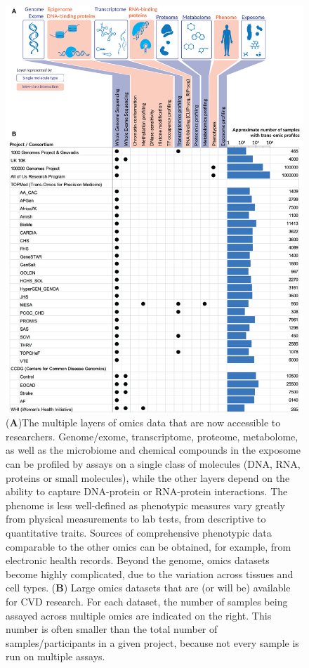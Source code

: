 \documentclass[letter]{bioinfo}
\begin{document}
    	\begin{figure}[!tpb]
	\includegraphics[width=0.9\linewidth]{trans-omics-data-sets.png}
		\caption{ (\textbf{A})The multiple layers of omics data that are now accessible to researchers. Genome/exome, transcriptome, proteome, metabolome, as well as the microbiome and chemical compounds in the exposome can be profiled by assays on a single class of molecules (DNA, RNA, proteins or small molecules), while the other layers depend on the ability to capture DNA-protein or RNA-protein interactions. The phenome is less well-defined as phenotypic measures vary greatly from physical measurements to lab tests, from descriptive to quantitative traits. Sources of comprehensive phenotypic data comparable to the other omics can be obtained, for example, from electronic health records.
		Beyond the genome, omics datasets become highly complicated, due to the variation across tissues and cell types.
		(\textbf{B}) Large omics datasets that are (or will be) available for CVD research. For each dataset, the number of samples being assayed across multiple omics are indicated on the right. This number is often smaller than the total number of samples/participants in a given project, because not every sample is run on multiple assays.}
		\label{fig:trans-omics}
	\end{figure} 
	
\end{document}
